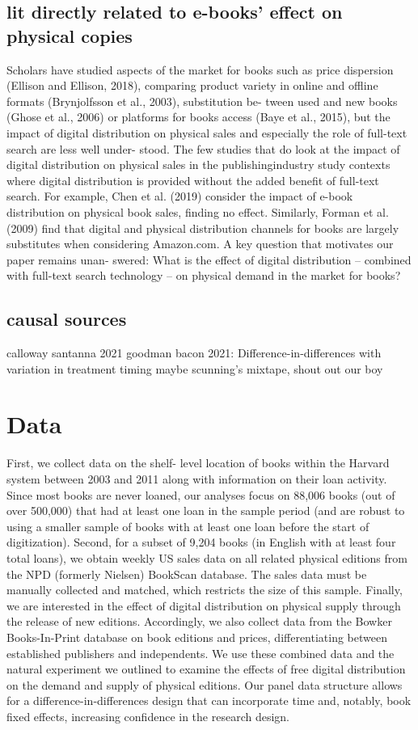 \documentclass{article}
\begin{document}
\subsection{lit directly related to e-books' effect on physical copies}
Scholars have studied aspects of the market for books such as price dispersion (Ellison and Ellison, 2018), comparing product variety in online and offline formats (Brynjolfsson et al., 2003), substitution be- tween used and new books (Ghose et al., 2006) or platforms for books access (Baye et al., 2015), but the impact of digital distribution on physical sales and especially the role of full-text search are less well under- stood. The few studies that do look at the impact of digital distribution on physical sales in the publishingindustry study contexts where digital distribution is provided without the added benefit of full-text search. For example, Chen et al. (2019) consider the impact of e-book distribution on physical book sales, finding no effect. Similarly, Forman et al. (2009) find that digital and physical distribution channels for books are largely substitutes when considering Amazon.com. A key question that motivates our paper remains unan- swered: What is the effect of digital distribution – combined with full-text search technology – on physical demand in the market for books?

\subsection{causal sources}
calloway santanna 2021
goodman bacon 2021: Difference-in-differences with variation in treatment timing
maybe scunning's mixtape, shout out our boy

\section{Data}

First, we collect data on the shelf- level location of books within the Harvard system between 2003 and 2011 along with information on their loan activity. Since most books are never loaned, our analyses focus on 88,006 books (out of over 500,000) that had at least one loan in the sample period (and are robust to using a smaller sample of books with at least one loan before the start of digitization). Second, for a subset of 9,204 books (in English with at least four total loans), we obtain weekly US sales data on all related physical editions from the NPD (formerly Nielsen) BookScan database. The sales data must be manually collected and matched, which restricts the size of this sample. Finally, we are interested in the effect of digital distribution on physical supply through the release of new editions. Accordingly, we also collect data from the Bowker Books-In-Print database on book editions and prices, differentiating between established publishers and independents. We use these combined data and the natural experiment we outlined to examine the effects of free digital distribution on the demand and supply of physical editions. Our panel data structure allows for a difference-in-differences design that can incorporate time and, notably, book fixed effects, increasing confidence in the research design.
\end{document}

